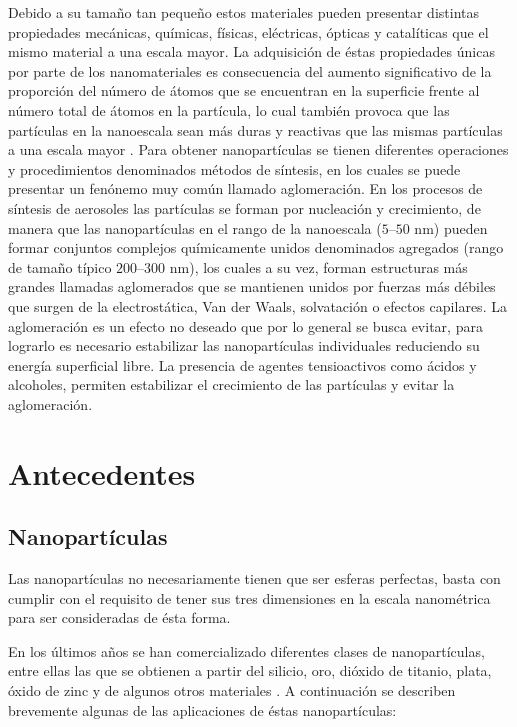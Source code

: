 \documentclass[3p,times,twocolumn]{elsarticle}
\begin{document}
Debido a su tamaño tan pequeño estos materiales pueden presentar distintas propiedades mecánicas, químicas, físicas, eléctricas, ópticas y catalíticas que el mismo material a una escala mayor. La adquisición de éstas propiedades únicas por parte de los nanomateriales es consecuencia del aumento significativo de la proporción del número de átomos que se encuentran en la superficie frente al número total de átomos en la partícula, lo cual también provoca que las partículas en la nanoescala sean más duras y reactivas que las mismas partículas a una escala mayor \cite{2}. Para obtener nanopartículas se tienen diferentes operaciones y procedimientos denominados métodos de síntesis, en los cuales se puede presentar un fenónemo muy común llamado aglomeración. En los procesos de síntesis de aerosoles las partículas se forman por nucleación y crecimiento, de manera que las nanopartículas en el rango de la nanoescala ($5$–$50$ nm) pueden formar conjuntos complejos químicamente unidos denominados agregados (rango de tamaño típico $200$–$300$ nm), los cuales a su vez, forman estructuras más grandes llamadas aglomerados que se mantienen unidos por fuerzas más débiles que surgen de la electrostática, Van der Waals, solvatación o efectos capilares. La aglomeración es un efecto no deseado que por lo general se busca evitar, para lograrlo es necesario estabilizar las nanopartículas individuales reduciendo su energía superficial libre. La presencia de agentes tensioactivos como ácidos y alcoholes, permiten estabilizar el crecimiento de las partículas y evitar la aglomeración.
 

\section{Antecedentes}\label{ant}

\subsection{Nanopartículas}
Las nanopartículas no necesariamente tienen que ser esferas perfectas, basta con cumplir con el requisito de tener sus tres dimensiones en la escala nanométrica para ser consideradas de ésta forma.

En los últimos años se han comercializado diferentes clases de nanopartículas, entre ellas las que se obtienen a partir del silicio, oro, dióxido de titanio, plata, óxido de zinc y de algunos otros materiales \cite{2}. A continuación se describen brevemente algunas de las aplicaciones de éstas nanopartículas:
\end{document}
